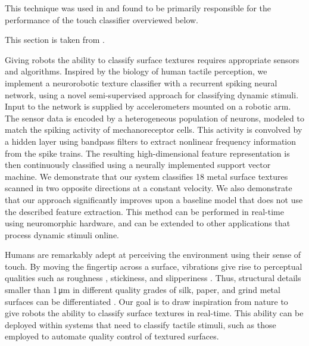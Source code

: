 This technique was used in \citet{voelker2016a} and found to be primarily responsible for the performance of the touch classifier overviewed below.

This section is taken from \citep{voelker2016a}.

Giving robots the ability to classify surface textures requires appropriate sensors and algorithms. Inspired by the biology of human tactile perception, we implement a neurorobotic texture classifier with a recurrent spiking neural network, using a novel semi-supervised approach for classifying dynamic stimuli. Input to the network is supplied by accelerometers mounted on a robotic arm. The sensor data is encoded by a heterogeneous population of neurons, modeled to match the spiking activity of mechanoreceptor cells. This activity is convolved by a hidden layer using bandpass filters to extract nonlinear frequency information from the spike trains. The resulting high-dimensional feature representation is then continuously classified using a neurally implemented support vector machine. We demonstrate that our system classifies 18 metal surface textures scanned in two opposite directions at a constant velocity. %
We also demonstrate that our approach significantly improves upon a baseline model that does not use the described feature extraction. 
This method can be performed in real-time using neuromorphic hardware, and can be extended to other applications that process dynamic stimuli online. 

Humans are remarkably adept at perceiving the environment using their sense of touch. By moving the fingertip across a surface, vibrations give rise to perceptual qualities such as roughness \citep{unger2013physical}, stickiness, and slipperiness \citep{klatzky2013haptic, holliins1993perceptual}. Thus, structural details smaller than 1\,\si{\micro\meter} in different quality grades of silk, paper, and grind metal surfaces can be differentiated \citep{weber2013spatial}.
Our goal is to draw inspiration from nature to give robots the ability to classify surface textures in real-time. This ability can be deployed within systems that need to classify tactile stimuli, such as those employed to automate quality control of textured surfaces. 



